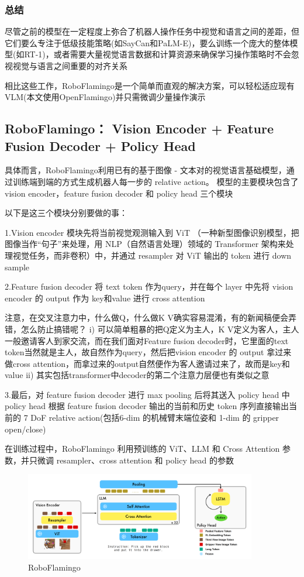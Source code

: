 \documentclass[12pt]{article}
\begin{document}
\subsubsection{总结}
尽管之前的模型在一定程度上弥合了机器人操作任务中视觉和语言之间的差距，但它们要么专注于低级技能策略(如SayCan和PaLM-E)，要么训练一个庞大的整体模型(如RT-1)，或者需要大量视觉语言数据和计算资源来确保学习操作策略时不会忽视视觉与语言之间重要的对齐关系

相比这些工作，RoboFlamingo是一个简单而直观的解决方案，可以轻松适应现有VLM(本文使用OpenFlamingo)并只需微调少量操作演示

\subsection{RoboFlamingo： Vision Encoder + Feature Fusion Decoder + Policy Head}
具体而言，RoboFlamingo利用已有的基于图像 - 文本对的视觉语言基础模型，通过训练端到端的方式生成机器人每一步的 relative action。
模型的主要模块包含了 vision encoder，feature fusion decoder 和 policy head 三个模块

以下是这三个模块分别要做的事：

1.Vision encoder 模块先将当前视觉观测输入到 ViT （一种新型图像识别模型，把图像当作“句子”来处理，用 NLP（自然语言处理）领域的 Transformer 架构来处理视觉任务，而非卷积）中，并通过 resampler 对 ViT 输出的 token 进行 down sample

2.Feature fusion decoder 将 text token 作为query，并在每个 layer 中先将 vision encoder 的 output 作为 key和value 进行 cross attention

注意，在交叉注意力中，什么做Q，什么做K V确实容易混淆，有的新闻稿便会弄错，怎么防止搞错呢？
i)  可以简单粗暴的把Q定义为主人，K V定义为客人，主人一般邀请客人到家交流，而在我们面对Feature fusion decoder时，它里面的text token当然就是主人，故自然作为query，然后把vision encoder 的 output 拿过来做cross attention，而拿过来的output自然便作为客人邀请过来了，故而是key和value
ii) 其实包括transformer中decoder的第二个注意力层便也有类似之意

3.最后，对 feature fusion decoder 进行 max pooling 后将其送入 policy head 中
policy head 根据 feature fusion decoder 输出的当前和历史 token 序列直接输出当前的 7 DoF relative action(包括6-dim 的机械臂末端位姿和 1-dim 的 gripper open/close)

在训练过程中，RoboFlamingo 利用预训练的 ViT、LLM 和 Cross Attention 参数，并只微调 resampler、cross attention 和 policy head 的参数

\begin{figure}[ht]  %
\centering
\includegraphics[width=0.9\textwidth]{pic4.png}
\caption{RoboFlamingo}
\end{figure}
\end{document}
